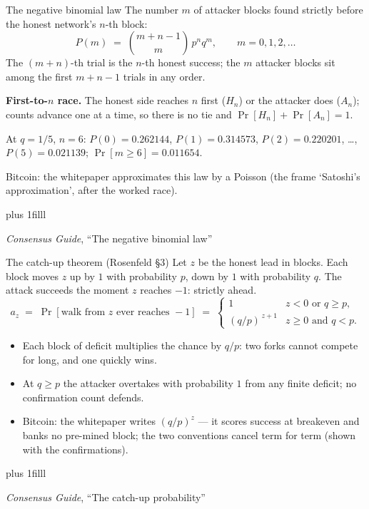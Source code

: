 \documentclass[aspectratio=169,11pt]{beamer}
\newcommand{\src}[1]{\par\vskip0pt plus 1filll
  {\fontsize{6}{7.2}\selectfont\color{arbdim}\raggedright #1\par}}
\begin{document}
\begin{frame}{The negative binomial law}
The number $m$ of attacker blocks found strictly before the honest
network's $n$-th block:
\[
  P(m) \;=\; \binom{m + n - 1}{m}\, p^{n} q^{m},
  \qquad m = 0, 1, 2, \ldots
\]
The $(m+n)$-th trial is the $n$-th honest success; the $m$ attacker
blocks sit among the first $m + n - 1$ trials in any order.
\medskip

\textbf{First-to-$n$ race.} The honest side reaches $n$ first ($H_n$)
or the attacker does ($A_n$); counts advance one at a time, so there
is no tie and $\Pr[H_n] + \Pr[A_n] = 1$.
\medskip

At $q = 1/5$, $n = 6$: $P(0) = 0.262144$, $P(1) = 0.314573$,
$P(2) = 0.220201$, \dots, $P(5) = 0.021139$;
$\Pr[m \geq 6] = 0.011654$.
\medskip

\alert{Bitcoin:} the whitepaper approximates this law by a Poisson
(the frame `Satoshi's approximation', after the worked race).
\src{\emph{Consensus Guide}, ``The negative binomial law''}
\end{frame}

\begin{frame}{The catch-up theorem (Rosenfeld \S3)}
Let $z$ be the honest lead in blocks. Each block moves $z$ up by $1$
with probability $p$, down by $1$ with probability $q$. The attack
succeeds the moment $z$ reaches $-1$: strictly ahead.
\[
  a_z \;=\; \Pr[\text{walk from } z \text{ ever reaches } -1]
  \;=\;
  \begin{cases}
    1 & z < 0 \text{ or } q \geq p,\\[2pt]
    (q/p)^{\,z+1} & z \geq 0 \text{ and } q < p.
  \end{cases}
\]
\begin{itemize}
\item Each block of deficit multiplies the chance by $q/p$: two forks
  cannot compete for long, and one quickly wins.
\item At $q \geq p$ the attacker overtakes with probability $1$ from
  any finite deficit; no confirmation count defends.
\item \alert{Bitcoin:} the whitepaper writes $(q/p)^{z}$ --- it scores
  success at breakeven and banks no pre-mined block; the two
  conventions cancel term for term (shown with the confirmations).
\end{itemize}
\src{\emph{Consensus Guide}, ``The catch-up probability''}
\end{frame}
\end{document}
